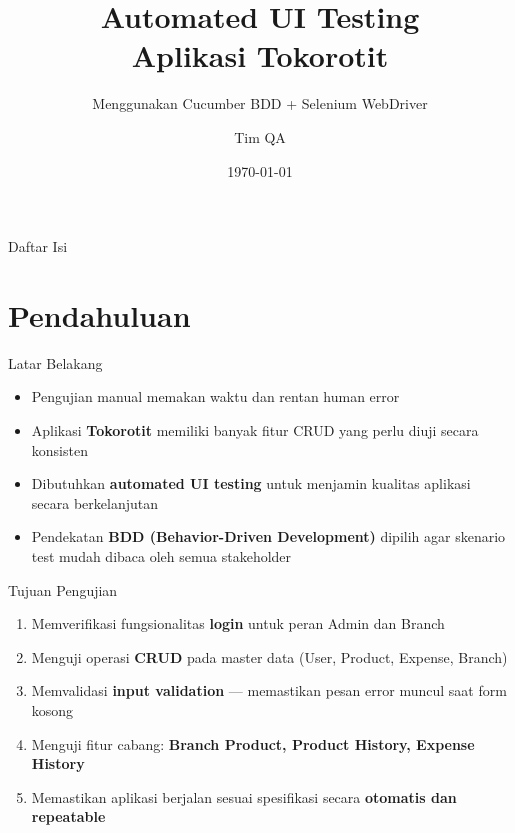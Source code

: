 \documentclass[aspectratio=169]{beamer}
\title[Tokorotit Testing]{Automated UI Testing\\Aplikasi Tokorotit}
\subtitle{Menggunakan Cucumber BDD + Selenium WebDriver}
\author{Tim QA}
\institute{}
\date{\today}
\begin{document}
\begin{frame}
  \titlepage
\end{frame}

\begin{frame}{Daftar Isi}
  \tableofcontents
\end{frame}

\section{Pendahuluan}

\begin{frame}{Latar Belakang}
  \begin{itemize}
    \item Pengujian manual memakan waktu dan rentan human error
    \item Aplikasi \textbf{Tokorotit} memiliki banyak fitur CRUD yang perlu diuji secara konsisten
    \item Dibutuhkan \textbf{automated UI testing} untuk menjamin kualitas aplikasi secara berkelanjutan
    \item Pendekatan \textbf{BDD (Behavior-Driven Development)} dipilih agar skenario test mudah dibaca oleh semua stakeholder
  \end{itemize}
\end{frame}

\begin{frame}{Tujuan Pengujian}
  \begin{enumerate}
    \item Memverifikasi fungsionalitas \textbf{login} untuk peran Admin dan Branch
    \item Menguji operasi \textbf{CRUD} pada master data (User, Product, Expense, Branch)
    \item Memvalidasi \textbf{input validation} — memastikan pesan error muncul saat form kosong
    \item Menguji fitur cabang: \textbf{Branch Product, Product History, Expense History}
    \item Memastikan aplikasi berjalan sesuai spesifikasi secara \textbf{otomatis dan repeatable}
  \end{enumerate}
\end{frame}
\end{document}
